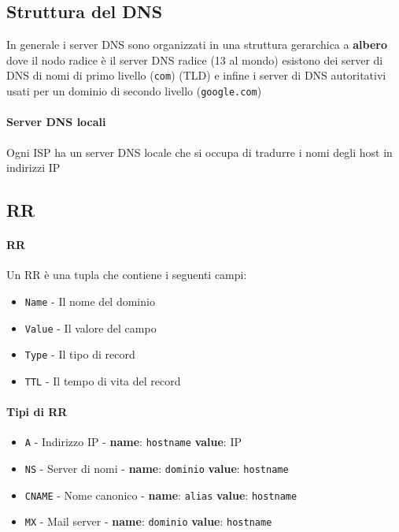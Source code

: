     \subsection[Struttura del DNS]{Struttura del \Acrshort*{DNS}}
        In generale i server \Acrshort*{DNS} sono organizzati in una struttura gerarchica a \textbf{albero} dove il nodo radice è il server \Acrshort*{DNS} radice (13 al mondo) esistono dei server di \Acrshort*{DNS} di nomi di primo livello (\texttt{com}) (\Acrshort*{TLD}) e infine i server di \Acrshort*{DNS} autoritativi usati per un dominio di secondo livello (\texttt{google.com})
        \paragraph{Server \Acrshort*{DNS} locali} Ogni ISP ha un server \Acrshort*{DNS} locale che si occupa di tradurre i nomi degli host in indirizzi IP
    \subsection[Resource Record (\texttt{RR})]{\acrfull*{RR}}
        \paragraph{\acrlong*{RR}} Un \Acrshort*{RR} è una tupla che contiene i seguenti campi:
        \begin{itemize}
            \item \texttt{Name} - Il nome del dominio
            \item \texttt{Value} - Il valore del campo
            \item \texttt{Type} - Il tipo di record
            \item \texttt{TTL} - Il tempo di vita del record
        \end{itemize}
        \paragraph{Tipi di \Acrshort*{RR}}
        \begin{itemize}
            \item \texttt{A} - Indirizzo \Acrshort*{IP} - \textbf{name}: \texttt{hostname} \textbf{value}: \Acrshort*{IP}
            \item \texttt{NS} - Server di nomi - \textbf{name}: \texttt{dominio} \textbf{value}: \texttt{hostname}
            \item \texttt{CNAME} - Nome canonico - \textbf{name}: \texttt{alias} \textbf{value}: \texttt{hostname}
            \item \texttt{MX} - Mail server - \textbf{name}: \texttt{dominio} \textbf{value}: \texttt{hostname}
        \end{itemize}
